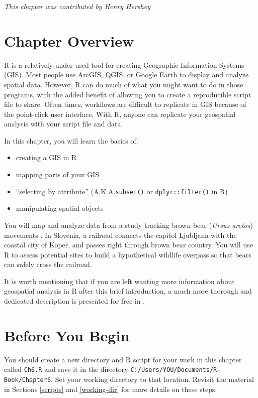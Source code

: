 \documentclass[]{book}
\providecommand{\tightlist}{%
  \setlength{\itemsep}{0pt}\setlength{\parskip}{0pt}}
\theoremstyle{definition}
\theoremstyle{definition}
\theoremstyle{definition}
\theoremstyle{remark}
\begin{document}
\emph{This chapter was contributed by Henry Hershey}

\section{Chapter Overview}\label{ch6overview}

R is a relatively under-used tool for creating Geographic Information
Systems (GIS). Most people use ArcGIS, QGIS, or Google Earth to display
and analyze spatial data. However, R can do much of what you might want
to do in those programs, with the added benefit of allowing you to
create a reproducible script file to share. Often times, workflows are
difficult to replicate in GIS because of the point-click user interface.
With R, anyone can replicate your geospatial analysis with your script
file and data.

In this chapter, you will learn the basics of:

\begin{itemize}
\tightlist
\item
  creating a GIS in R
\item
  mapping parts of your GIS
\item
  ``selecting by attribute'' (A.K.A.\texttt{subset()} or
  \texttt{dplyr::filter()} in R)
\item
  manipulating spatial objects
\end{itemize}

You will map and analyze data from a study tracking brown bear
(\emph{Ursus arctos}) movements \citep{bears-cite}. In Slovenia, a
railroad connects the capitol Ljubljana with the coastal city of Koper,
and passes right through brown bear country. You will use R to assess
potential sites to build a hypothetical wildlife overpass so that bears
can safely cross the railroad.

It is worth mentioning that if you are left wanting more information
about geospatial analysis in R after this brief introduction, a much
more thorough and dedicated description is presented for free in
\citet{geospatR-cite}.

\section{Before You Begin}\label{ch6beforeyoubegin}

You should create a new directory and R script for your work in this
chapter called \texttt{Ch6.R} and save it in the directory
\texttt{C:/Users/YOU/Documents/R-Book/Chapter6}. Set your working
directory to that location. Revisit the material in Sections
\ref{scripts} and \ref{working-dir} for more details on these steps.
\end{document}
